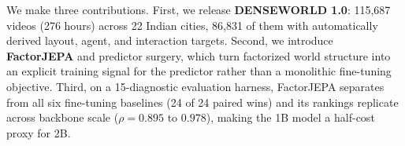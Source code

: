We make three contributions. First, we release \textbf{DENSEWORLD 1.0}:
115,687 videos (276 hours) across 22 Indian cities, 86,831 of them with
automatically derived layout, agent, and interaction targets. Second, we
introduce \textbf{FactorJEPA} and predictor surgery, which turn
factorized world structure into an explicit training signal for the
predictor rather than a monolithic fine-tuning objective. Third, on a
15-diagnostic evaluation harness, FactorJEPA separates from all six
fine-tuning baselines (24 of 24 paired wins) and its rankings replicate
across backbone scale ($\rho=0.895$ to $0.978$), making the 1B model a
half-cost proxy for 2B.















































































